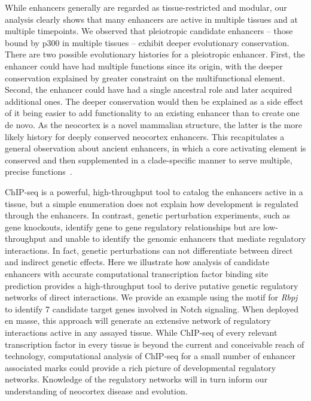 While enhancers generally are regarded as tissue-restricted and modular, our analysis clearly shows that many enhancers are active in multiple
tissues and at multiple timepoints.  We observed that pleiotropic candidate enhancers -- those bound by p300 in multiple tissues -- exhibit
deeper evolutionary conservation.  There are two possible evolutionary histories for a pleiotropic enhancer.  First, the enhancer could have
had multiple functions since its origin, with the deeper conservation explained by greater constraint on the multifunctional element.
Second, the enhancer could have had a single ancestral role and later acquired additional ones.  The deeper conservation would then be explained
as a side effect of it being easier to add functionality to an existing enhancer than to create one de novo.  As the neocortex is a novel mammalian
structure, the latter is the more likely history for deeply conserved neocortex enhancers.  This recapitulates a general observation about ancient
enhancers, in which a core activating element is conserved and then supplemented in a clade-specific manner to serve multiple,
precise functions~\citep{Royo2011}.

ChIP-seq is a powerful, high-throughput tool to catalog the enhancers active in a tissue, but a simple enumeration does not explain how development
is regulated through the enhancers.  In contrast, genetic perturbation experiments, such as gene knockouts, identify gene to gene regulatory relationships
but are low-throughput and unable to identify the genomic enhancers that mediate regulatory interactions.  In fact, genetic perturbations can not
differentiate between direct and indirect genetic effects.  Here we illustrate how analysis of candidate enhancers with accurate computational transcription
factor binding site prediction provides a high-throughput tool to derive putative genetic regulatory networks of direct interactions.  We provide an example
using the motif for \textit{Rbpj} to identify 7 candidate target genes involved in Notch signaling.  When deployed en masse, this approach will generate an extensive
network of regulatory interactions active in any assayed tissue.  While ChIP-seq of every relevant transcription factor in every tissue is beyond the
current and conceivable reach of technology, computational analysis of ChIP-seq for a small number of enhancer associated marks could provide a rich
picture of developmental regulatory networks.  Knowledge of the regulatory networks will in turn inform our understanding of neocortex disease
and evolution.

